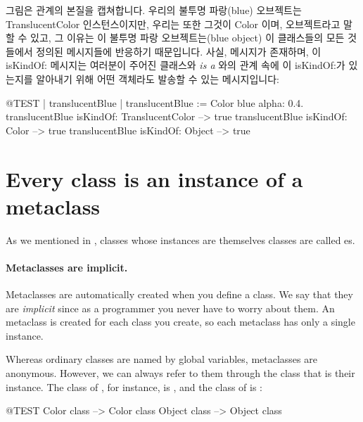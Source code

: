 \documentclass[a4paper,10pt,twoside]{book}
\begin{document}
그림은  관계의 본질을 캡쳐합니다. 우리의 불투명 파랑(blue) 오브젝트는 TranslucentColor 인스턴스이지만, 우리는 또한 그것이 Color 이며, 오브젝트라고 말할 수 있고, 그 이유는 이 불투명 파랑 오브젝트는(blue object) 이 클래스들의 모든 것들에서 정의된 메시지들에 반응하기 때문입니다. 
사실,  메시지가 존재하며, 이 isKindOf: 메시지는 여러분이 주어진 클래스와 \emph{is a} 와의 관계 속에 이 isKindOf:가 있는지를 알아내기 위해 어떤 객체라도 발송할 수 있는 메시지입니다:

\begin{code}{@TEST | translucentBlue |}
translucentBlue := Color blue alpha: 0.4.
translucentBlue isKindOf: TranslucentColor --> true
translucentBlue isKindOf: Color                    --> true
translucentBlue isKindOf: Object                  --> true
\end{code}

\section{Every class is an instance of a metaclass}


As we mentioned in , classes whose instances are themselves classes are called es.

\paragraph{Metaclasses are implicit.}
Metaclasses are automatically created when you define a class. We say that they are \emph{implicit} since as a programmer you never have to worry about them. An  metaclass is created for each class you create, so each metaclass has only a single instance.

Whereas ordinary classes are named by global variables, metaclasses are anonymous.
However, we can always refer to them through the class that is their instance.
The class of , for instance, is , and the class of  is :
\begin{code}{@TEST}
Color class   --> Color class
Object class --> Object class
\end{code}
\end{document}
